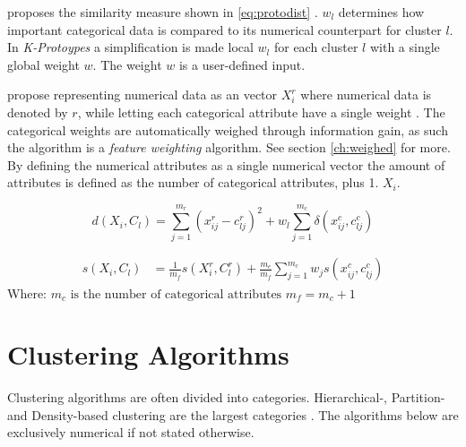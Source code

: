 \documentclass[../report.tex]{subfiles}
\begin{document}
\citeauthor{Huang97clusteringlarge} proposes the similarity measure shown in \ref{eq:protodist} \cite{Huang97clusteringlarge}. $w_l$ determines how important categorical data is compared to its numerical counterpart for cluster $l$. In \textit{K-Protoypes} a simplification is made local $w_l$ for each cluster $l$ with a single global weight $w$. The weight $w$ is a user-defined input.

\citeauthor{Cheung2013} \cite{Cheung2013} propose representing numerical data as an vector $X_{i}^{r}$ where numerical data is denoted by $r$, while letting each categorical attribute have a single weight . The categorical weights are automatically weighed through information gain, as such the algorithm is a \textit{feature weighting} algorithm. See section \ref{ch:weighed} for more. By defining the numerical attributes as a single numerical vector the amount of attributes is defined as the number of categorical attributes, plus 1. $X_{i}$.

\begin{equation}
\label{eq:protodist}
d(X_i, C_l) = \sum_{j=1}^{m_r}( x_{ij}^{r} - c_{lj}^{r} )^2 +
  w_l \sum_{j=1}^{m_c}\delta( x_{ij}^c, c_{lj}^c )
\end{equation}

\begin{align}
\label{eq:mixJia}
s(X_{i},C_{l}) &= \frac{1}{m_f}s(X_{i}^r,C_{l}^r) + \frac{m_c}{m_f}\sum_{j = 1}^{m_c}{{w_j}s(x_{ij}^c,c_{lj}^c)}
\end{align}
Where:\newline
$m_c \text{ is the number of categorical attributes}$ \newline
$m_f = m_c + 1$




\section{Clustering Algorithms}
Clustering algorithms are often divided into categories. Hierarchical-, Partition- and Density-based clustering are the largest categories \cite{Xu2015}. The algorithms below are exclusively numerical if not stated otherwise.
\end{document}

